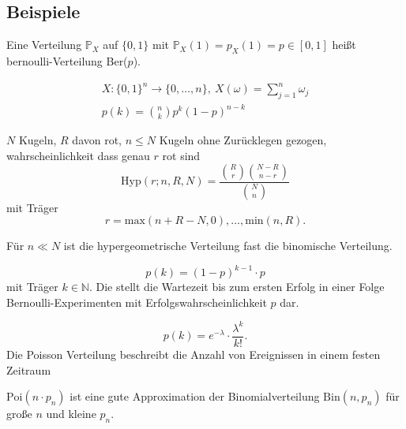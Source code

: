 \documentclass[prb,12pt, twocolumn]{revtex4-2}
\theoremstyle{definition}
\theoremstyle{definition}
\theoremstyle{definition}
\newcommand{\N}{\mathbb{N}}
\begin{document}
\subsection{Beispiele}
\begin{Note}
	Eine Verteilung $\mathbb{P}_X$ auf $\{0, 1\}$ mit $\mathbb{P}_X (1) = p_X(1) = p \in [0, 1]$ heißt bernoulli-Verteilung Ber($p$).
\end{Note}
\begin{Note}[Binomialverteilung]
	\begin{gather*}
	X: \{0,1\}^n \to \{0,\dots, n\},~X(\omega) = \sum_{j=1}^{n} \omega_j\\
	p(k) = \binom{n}{k}p^k (1-p)^{n-k}
\end{gather*}
\end{Note}
\begin{Note}
	$N$ Kugeln, $R$ davon rot, $n\le N$ Kugeln ohne Zur\"{u}cklegen gezogen, wahrscheinlichkeit dass genau $r$ rot sind
	\[
		\text{Hyp}(r; n, R, N)=\frac{\binom{R}{r}\binom{N-R}{n-r}}{\binom{N}{n}}
	\]
	mit Tr\"{a}ger
	\[
		r=\text{max}(n+R-N, 0), \dots, \text{min}(n,R)
	.\] 
\end{Note}
\begin{Note}
	F\"{u}r $n\ll N$ ist die hypergeometrische Verteilung fast die binomische Verteilung.
\end{Note}
\begin{Note}
	\[
		p(k) = (1-p)^{k-1}\cdot p
	\]
	mit Tr\"{a}ger $k\in \N$. Die stellt die Wartezeit bis zum ersten Erfolg in einer Folge Bernoulli-Experimenten mit Erfolgswahrscheinlichkeit $p$ dar.
\end{Note}
\begin{Note}
	\[
		p(k) = e^{-\lambda} \cdot \frac{\lambda^k}{k!}
	.\]
	Die Poisson Verteilung beschreibt die Anzahl von Ereignissen in einem festen Zeitraum
\end{Note}
\begin{Note}
	$\text{Poi}(n\cdot p_n)$ ist eine gute Approximation der Binomialverteilung $\text{Bin}(n, p_n)$ f\"{u}r große $n$ und kleine $p_n$.
\end{Note}
\end{document}
